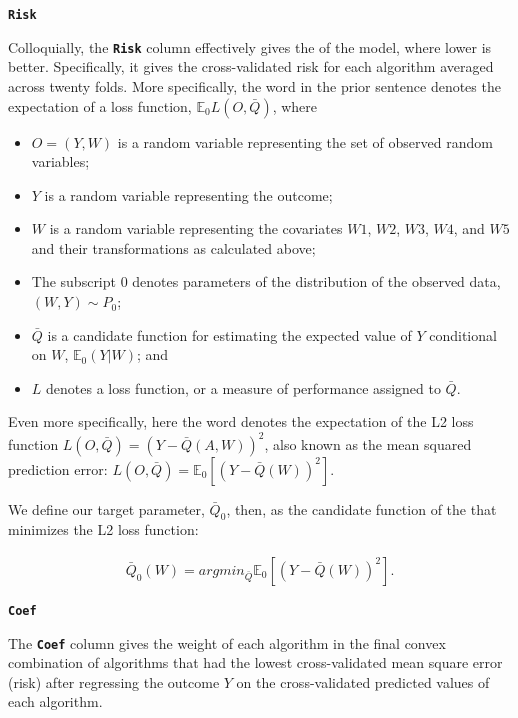 \documentclass{article}\usepackage[]{graphicx}\usepackage[]{xcolor}
\begin{document}
\textbf{\texttt{Risk}} 

Colloquially, the \textbf{\texttt{Risk}} column effectively gives the  of the model, where lower is better. Specifically, it gives the cross-validated risk for each algorithm averaged across twenty folds. More specifically, the word  in the prior sentence denotes the expectation of a loss function, $\mathbb{E}_0L(O,\bar{Q})$, where

\begin{itemize}
  \item $O = (Y,W)$ is a random variable representing the set of observed random variables;
  \item $Y$ is a random variable representing the outcome;
  \item $W$ is a random variable representing the covariates $W1$, $W2$, $W3$, $W4$, and $W5$ and their transformations as calculated above;
    \item The subscript $0$ denotes parameters of the distribution of the observed data, $(W, Y) \sim P_0$;
  \item $\bar{Q}$ is a candidate function for estimating the expected value of $Y$ conditional on $W$, $\mathbb{E}_0(Y|W)$; and
  \item $L$ denotes a loss function, or a measure of performance assigned to $\bar{Q}$.

\end{itemize}

Even more specifically, here the word  denotes the expectation of the L2 loss function $L(O,\bar{Q})=(Y-\bar{Q}(A,W))^2$, also known as the mean squared prediction error: $L(O,\bar{Q})=\mathbb{E}_0[(Y-\bar{Q}(W))^2]$.

\vspace{2mm}

We define our target parameter, $\bar{Q}_0$, then, as the candidate function of the that minimizes the L2 loss function:

\begin{align*}
\bar{Q}_0(W) = argmin_{\bar{Q}}\mathbb{E}_0[(Y-\bar{Q}(W))^2].
\end{align*}

\textbf{\texttt{Coef}} 

The \textbf{\texttt{Coef}} column gives the weight of each algorithm in the final convex combination of algorithms that had the lowest cross-validated mean square error (risk) after regressing the outcome $Y$ on the cross-validated predicted values of each algorithm.
\end{document}
